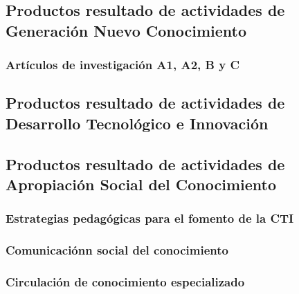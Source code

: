 \documentclass[spanish,notitlepage,letterpaper,11pt]{article} %
\begin{document}
\subsection{Productos resultado de actividades de Generación Nuevo
  Conocimiento} 

\subsubsection{Art\'iculos de investigaci\'on A1, A2, B y C}

\subsection{Productos resultado de actividades de Desarrollo
  Tecnol\'ogico e Innovaci\'on} 

\subsection{Productos resultado de actividades de Apropiación Social
  del Conocimiento} 

\subsubsection{Estrategias pedag\'ogicas para el fomento de la CTI}

\subsubsection{Comunicaci\'onn social del conocimiento}

\subsubsection{Circulaci\'on de conocimiento especializado}
\end{document}
